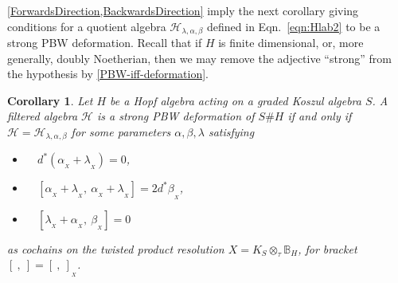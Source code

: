 \documentclass[11pt]{amsart}
\numberwithin{equation}{section}
\newtheorem{cor}[equation]{Corollary}
\newcommand{\X}{_X}
\newcommand{\alphax}{\alpha_{\X}}
\newcommand{\betax}{\beta_{\X}}
\newcommand{\lambdax}{\lambda_{\X}}
\newcommand{\chabl}{\cH_{\lambda,\alpha,\beta}}
\newcommand{\BB}{\mathbb{B}} %
\renewcommand{\_}[1]{\mbox{$_{\left( #1 \right)}$}}
\newcommand{\ott}{\otimes_{\tau}}
\newcommand{\Ho}{H}%
\newcommand{\cH}{\mathcal{H}}
\begin{document}
{\cref{ForwardsDirection,BackwardsDirection}
imply the next corollary giving conditions
for a quotient algebra $\chabl$
defined in 
Eqn.~\eqref{eqn:Hlab2} to be a strong PBW deformation.
Recall that if $H$ is finite dimensional, or, more generally, doubly  Noetherian, then
we may remove the adjective ``strong'' from the hypothesis by
\cref{PBW-iff-deformation}.

\vspace{2ex}

\begin{cor}\label{hom-condns} 
Let $\Ho$ be a Hopf algebra 
acting 
on a graded Koszul algebra $S$. 
A filtered algebra $\cH$  is a strong PBW deformation of $S\# \Ho$ if and only if 
$\cH=\chabl$
for some parameters $\alpha,\beta,\lambda$ satisfying 
  \begin{itemize}
    \item[(a)]\ \ $d^*(\alphax+\lambdax) = 0$, 
    \item[(b)]\ \ $[\alphax+\lambdax,\ \alphax + \lambdax]=2d^*\betax$, 
    \item[(c)]\ \ $[\lambdax + \alphax,\ \betax]= 0$ 
  \end{itemize}
  as cochains on the twisted product resolution 
$X=K_S\ott \BB_\Ho$, for bracket $[\ ,\ ]=[\ ,  \ ]_{\X}$.
  \end{cor}

\vspace{1ex}
  
}
\end{document}
